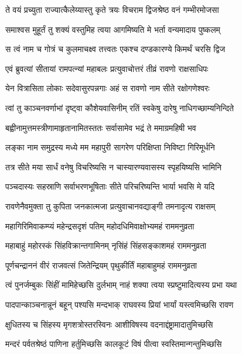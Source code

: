 \twolineshloka
{ते वयं प्रच्युता राज्यात्कैलेय्यास्तु कृते त्रयः}
{विचराम द्विजश्रेष्ठ वनं गम्भीरमोजसा} %

\twolineshloka
{समाश्वस मुहूर्तं तु शक्यं वस्तुमिह त्वया}
{आगमिष्यति मे भर्ता वन्यमादाय पुष्कलम्} %

\twolineshloka
{स त्वं नाम च गोत्रं च कुलमाचक्ष्व तत्त्वतः}
{एकश्च दण्डकारण्ये किमर्थं चरसि द्विज} %

\twolineshloka
{एवं ब्रुवत्यां सीतायां रामपत्न्यां महाबलः}
{प्रत्युवाचोत्तरं तीव्रं रावणो राक्षसाधिपः} %

\twolineshloka
{येन वित्रासिता लोकाः सदेवासुरपन्नगाः}
{अहं स रावणो नाम सीते रक्षोगणेश्वरः} %

\twolineshloka
{त्वां तु काञ्चनवर्णाभां दृष्ट्वा कौशेयवासिनीम्}
{रतिं स्वकेषु दारेषु नाधिगच्छाम्यनिन्दिते} %

\twolineshloka
{बह्वीनामुत्तमस्त्रीणामाहृतानामितस्ततः}
{सर्वासामेव भद्रं ते ममाग्रमहिषी भव} %

\twolineshloka
{लङ्का नाम समुद्रस्य मध्ये मम महापुरी}
{सागरेण परिक्षिप्ता निविष्टा गिरिमूर्धनि} %

\twolineshloka
{तत्र सीते मया सार्धं वनेषु विचरिष्यसि}
{न चास्यारण्यवासस्य स्पृहयिष्यसि भामिनि} %

\twolineshloka
{पञ्चदास्यः सहस्राणि सर्वाभरणभूषिताः}
{सीते परिचरिष्यन्ति भार्या भवसि मे यदि} %

\twolineshloka
{रावणेनैवमुक्ता तु कुपिता जनकात्मजा}
{प्रत्युवाचानवद्याङ्गी तमनादृत्य राक्षसम्} %

\twolineshloka
{महागिरिमिवाकम्प्यं महेन्द्रसदृशं पतिम्}
{महोदधिमिवाक्षोभ्यमहं राममनुव्रता} %

\twolineshloka
{महाबाहुं महोरस्कं सिंहविक्रान्तगामिनम्}
{नृसिंहं सिंहसङ्काशमहं राममनुव्रता} %

\twolineshloka
{पूर्णचन्द्राननं वीरं राजवत्सं जितेन्द्रियम्}
{पृथुकीर्तिं महाबाहुमहं राममनुव्रता} %

\twolineshloka
{त्वं पुनर्जम्बुकः सिंहीं मामिहेच्छसि दुर्लभाम्}
{नाहं शक्या त्वया स्प्रष्टुमादित्यस्य प्रभा यथा} %

\twolineshloka
{पादपान्काञ्चनान्नूनं बहून् पश्यसि मन्दभाक्}
{राघवस्य प्रियां भार्यां यस्त्वमिच्छसि रावण} %

\twolineshloka
{क्षुधितस्य च सिंहस्य मृगशत्रोस्तरस्विनः}
{आशीविषस्य वदनाद्दंष्ट्रामादातुमिच्छसि} %

\twolineshloka
{मन्दरं पर्वतश्रेष्ठं पाणिना हर्तुमिच्छसि}
{कालकूटं विषं पीत्वा स्वस्तिमान्गन्तुमिच्छसि} %

